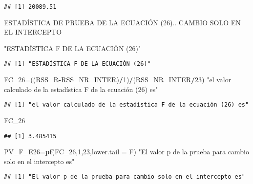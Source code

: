 \documentclass[
]{article}
\newenvironment{Shaded}{\begin{snugshade}}{\end{snugshade}}
\newcommand{\DataTypeTok}[1]{\textcolor[rgb]{0.13,0.29,0.53}{#1}}
\newcommand{\DecValTok}[1]{\textcolor[rgb]{0.00,0.00,0.81}{#1}}
\newcommand{\KeywordTok}[1]{\textcolor[rgb]{0.13,0.29,0.53}{\textbf{#1}}}
\newcommand{\NormalTok}[1]{#1}
\newcommand{\OperatorTok}[1]{\textcolor[rgb]{0.81,0.36,0.00}{\textbf{#1}}}
\newcommand{\StringTok}[1]{\textcolor[rgb]{0.31,0.60,0.02}{#1}}
\begin{document}
\begin{verbatim}
## [1] 20089.51
\end{verbatim}

ESTADÍSTICA DE PRUEBA DE LA ECUACIÓN (26).. CAMBIO SOLO EN EL INTERCEPTO

\begin{Shaded}
\begin{Highlighting}[]
\StringTok{"ESTADÍSTICA F DE LA ECUACIÓN (26)"}
\end{Highlighting}
\end{Shaded}

\begin{verbatim}
## [1] "ESTADÍSTICA F DE LA ECUACIÓN (26)"
\end{verbatim}

\begin{Shaded}
\begin{Highlighting}[]
\NormalTok{FC_}\DecValTok{26}\NormalTok{=((RSS_R}\OperatorTok{-}\NormalTok{RSS_NR_INTER)}\OperatorTok{/}\DecValTok{1}\NormalTok{)}\OperatorTok{/}\NormalTok{(RSS_NR_INTER}\OperatorTok{/}\DecValTok{23}\NormalTok{)}
\StringTok{"el valor calculado de la estadística F de la ecuación (26) es"}
\end{Highlighting}
\end{Shaded}

\begin{verbatim}
## [1] "el valor calculado de la estadística F de la ecuación (26) es"
\end{verbatim}

\begin{Shaded}
\begin{Highlighting}[]
\NormalTok{FC_}\DecValTok{26}
\end{Highlighting}
\end{Shaded}

\begin{verbatim}
## [1] 3.485415
\end{verbatim}

\begin{Shaded}
\begin{Highlighting}[]
\NormalTok{PV_F_E26=}\KeywordTok{pf}\NormalTok{(FC_}\DecValTok{26}\NormalTok{,}\DecValTok{1}\NormalTok{,}\DecValTok{23}\NormalTok{,}\DataTypeTok{lower.tail =}\NormalTok{ F)}
\StringTok{"El valor p de la prueba para cambio solo en el intercepto es"}
\end{Highlighting}
\end{Shaded}

\begin{verbatim}
## [1] "El valor p de la prueba para cambio solo en el intercepto es"
\end{verbatim}
\end{document}
